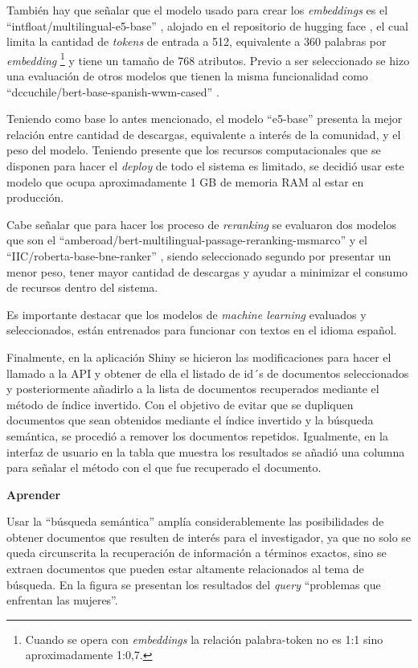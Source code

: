 \documentclass[
  12pt,
  openany]{book}
\begin{document}
También hay que señalar que el modelo usado para crear los \emph{embeddings} es el ``intfloat/multilingual-e5-base'' \citep{wang2022}, alojado en el repositorio de hugging face \citep{e5base}, el cual limita la cantidad de \emph{tokens} de entrada a 512, equivalente a 360 palabras por \emph{embedding} \footnote{Cuando se opera con \emph{embeddings} la relación palabra-token no es 1:1 sino aproximadamente 1:0,7.} y tiene un tamaño de 768 atributos. Previo a ser seleccionado se hizo una evaluación de otros modelos que tienen la misma funcionalidad como ``dccuchile/bert-base-spanish-wwm-cased'' \citep{canete2020}.

Teniendo como base lo antes mencionado, el modelo ``e5-base'' presenta la mejor relación entre cantidad de descargas, equivalente a interés de la comunidad, y el peso del modelo. Teniendo presente que los recursos computacionales que se disponen para hacer el \emph{deploy} de todo el sistema es limitado, se decidió usar este modelo que ocupa aproximadamente 1 GB de memoria RAM al estar en producción.

Cabe señalar que para hacer los proceso de \emph{reranking} se evaluaron dos modelos que son el ``amberoad/bert-multilingual-passage-reranking-msmarco'' \citep{erankingmsmarco} y el ``IIC/roberta-base-bne-ranker'' \citep{hfranker2023}, siendo seleccionado segundo por presentar un menor peso, tener mayor cantidad de descargas y ayudar a minimizar el consumo de recursos dentro del sistema.

Es importante destacar que los modelos de \emph{machine learning} evaluados y seleccionados, están entrenados para funcionar con textos en el idioma español.

Finalmente, en la aplicación Shiny se hicieron las modificaciones para hacer el llamado a la API y obtener de ella el listado de id´s de documentos seleccionados y posteriormente añadirlo a la lista de documentos recuperados mediante el método de índice invertido. Con el objetivo de evitar que se dupliquen documentos que sean obtenidos mediante el índice invertido y la búsqueda semántica, se procedió a remover los documentos repetidos. Igualmente, en la interfaz de usuario en la tabla que muestra los resultados se añadió una columna para señalar el método con el que fue recuperado el documento.

\textbf{Aprender}

Usar la ``búsqueda semántica'' amplía considerablemente las posibilidades de obtener documentos que resulten de interés para el investigador, ya que no solo se queda circunscrita la recuperación de información a términos exactos, sino se extraen documentos que pueden estar altamente relacionados al tema de búsqueda. En la figura se presentan los resultados del \emph{query} ``problemas que enfrentan las mujeres''.
\end{document}

